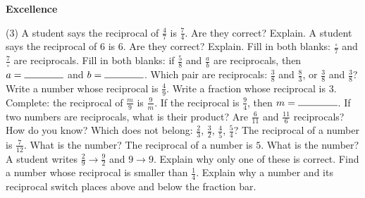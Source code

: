 \documentclass[17pt,a4paper,landscape]{extarticle}
\begin{document}
\sffamily
\boldmath

\boldmath

{\LARGE \textbf{Excellence}}
\begin{tasks}(3)
\task A student says the reciprocal of \mbox{$\frac{4}{7}$} is \mbox{$\frac{7}{4}$}. Are they correct? Explain.
\task A student says the reciprocal of \mbox{$6$} is \mbox{$6$}. Are they correct? Explain.
\task Fill in both blanks: \mbox{$\frac{\square}{7}$} and \mbox{$\frac{7}{\square}$} are reciprocals.
\task Fill in both blanks: if \mbox{$\frac{5}{8}$} and \mbox{$\frac{a}{b}$} are reciprocals, then \mbox{$a=\rule{1.4cm}{0.15mm}$} and \mbox{$b=\rule{1.4cm}{0.15mm}$}.
\task Which pair are reciprocals: \mbox{$\frac{3}{8}$} and \mbox{$\frac{8}{3}$}, or \mbox{$\frac{3}{8}$} and \mbox{$\frac{3}{8}$}?
\task Write a number whose reciprocal is \mbox{$\frac{4}{9}$}.
\task Write a fraction whose reciprocal is \mbox{$3$}.
\task Complete: the reciprocal of \mbox{$\frac{m}{9}$} is \mbox{$\frac{9}{m}$}. If the reciprocal is \mbox{$\frac{9}{4}$}, then \mbox{$m=\rule{1.4cm}{0.15mm}$}.
\task If two numbers are reciprocals, what is their product?
\task Are \mbox{$\frac{6}{11}$} and \mbox{$\frac{11}{6}$} reciprocals? How do you know?
\task Which does not belong: \mbox{$\frac{2}{3}$}, \mbox{$\frac{3}{2}$}, \mbox{$\frac{4}{5}$}, \mbox{$\frac{5}{4}$}?
\task The reciprocal of a number is \mbox{$\frac{7}{12}$}. What is the number?
\task The reciprocal of a number is \mbox{$5$}. What is the number?
\task A student writes \mbox{$\frac{2}{9}\to\frac{9}{2}$} and \mbox{$9\to9$}. Explain why only one of these is correct.
\task Find a number whose reciprocal is smaller than \mbox{$\frac{1}{4}$}.
\task Explain why a number and its reciprocal switch places above and below the fraction bar.
\end{tasks}
\end{document}
